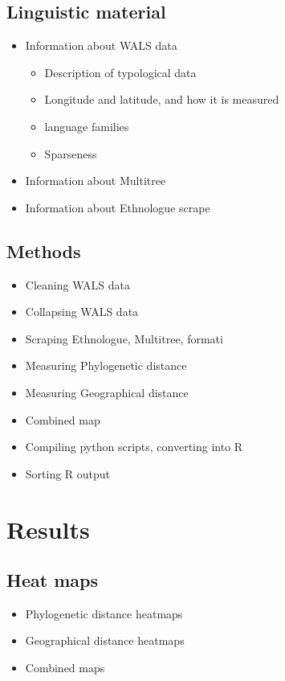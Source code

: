 \documentclass[11pt]{article}
\begin{document}
\subsection{Linguistic material}
\begin{itemize}
\item Information about WALS data
\begin{itemize} \item Description of typological data
\item Longitude and latitude, and how it is measured
\item language families
\item Sparseness \end{itemize}
\item Information about Multitree\cite{multitree}
\item Information about Ethnologue\cite{ethnologue} scrape %
\end{itemize}

\subsection{Methods}
\begin{itemize}
\item Cleaning WALS data
\item Collapsing WALS data
\item Scraping Ethnologue, Multitree, formati
\item Measuring Phylogenetic distance
\item Measuring Geographical distance
\item Combined map
\item Compiling python scripts, converting into R
\item Sorting R output
\end{itemize}

\section{Results} %
\subsection{Heat maps}
\begin{itemize}
\item Phylogenetic distance heatmaps
\item Geographical distance heatmaps
\item Combined maps
\end{itemize}
\end{document}
